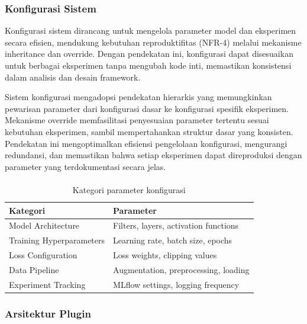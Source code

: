 \documentclass[12pt,a4paper]{article}
\begin{document}
\subsubsection{Konfigurasi Sistem}
\label{subsubsec:sistem-konfigurasi}

Konfigurasi sistem dirancang untuk mengelola parameter model dan eksperimen secara efisien, mendukung kebutuhan reproduktifitas (NFR-4) melalui mekanisme inheritance dan override. Dengan pendekatan ini, konfigurasi dapat disesuaikan untuk berbagai eksperimen tanpa mengubah kode inti, memastikan konsistensi dalam analisis dan desain framework.

Sistem konfigurasi mengadopsi pendekatan hierarkis yang memungkinkan pewarisan parameter dari konfigurasi dasar ke konfigurasi spesifik eksperimen. Mekanisme override memfasilitasi penyesuaian parameter tertentu sesuai kebutuhan eksperimen, sambil mempertahankan struktur dasar yang konsisten. Pendekatan ini mengoptimalkan efisiensi pengelolaan konfigurasi, mengurangi redundansi, dan memastikan bahwa setiap eksperimen dapat direproduksi dengan parameter yang terdokumentasi secara jelas.

\paragraph{ }
\begin{table}[H]
\centering
\caption{Kategori parameter konfigurasi}
\label{tab:config-categories}
\small
\begin{tabular}{|l|l|}
\hline
\textbf{Kategori} & \textbf{Parameter} \\
\hline
Model Architecture & Filters, layers, activation functions \\
\hline
Training Hyperparameters & Learning rate, batch size, epochs \\
\hline
Loss Configuration & Loss weights, clipping values \\
\hline
Data Pipeline & Augmentation, preprocessing, loading \\
\hline
Experiment Tracking & MLflow settings, logging frequency \\
\hline
\end{tabular}
\end{table}

\subsubsection{Arsitektur Plugin}
\label{subsubsec:plugin-architecture}
\end{document}
